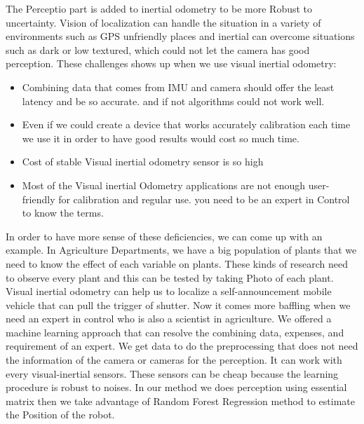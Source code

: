 \documentclass[a4paper,twoside]{article}
\begin{document}
The Perceptio part is added to inertial odometry to be more Robust to uncertainty. Vision of localization can handle the situation in a variety of environments such as GPS unfriendly places and inertial can overcome situations such as dark or low textured, which could not let the camera has good perception.
These challenges shows up when we use visual inertial odometry:
\begin{itemize}
\item Combining data that comes from IMU and camera should offer the least latency and be so accurate. and if not algorithms could not work well.
\item Even if we could create a device that works accurately calibration each time we use it in order to have good results would cost so much time.
\item Cost of stable Visual inertial odometry sensor is so high
\item Most of the Visual inertial Odometry applications are not enough user-friendly for calibration and regular use. you need to be an expert in Control to know the terms.
\end{itemize}
In order to have more sense of these deficiencies, we can come up with an example. In Agriculture Departments, we have a big population of plants that we need to know the effect of each variable on plants. These kinds of research need to observe every plant and this can be tested by taking Photo of each plant. Visual inertial odometry can help us to localize a self-announcement mobile vehicle that can pull the trigger of shutter. Now it comes more baffling when we need an expert in control who is also a scientist in agriculture. 
We offered a machine learning approach that can resolve the combining data, expenses, and requirement of an expert.
We get data to do the preprocessing that does not need the information of the camera or cameras for the perception. It can work with every visual-inertial sensors. These sensors can be cheap because the learning procedure is robust to noises.
In our method we does perception using essential matrix then we take advantage of Random Forest Regression method to estimate the Position of the robot.  

 
 
 
\end{document}
